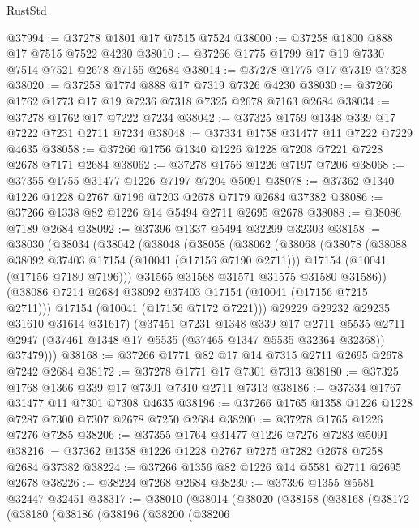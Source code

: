 \begin{lexlean}{RustStd}
\begin{coremodule}
@37994 := @37278 @1801 @17 @7515 @7524
@38000 := @37258 @1800 @888 @17 @7515 @7522 @4230
@38010 := @37266 @1775 @1799 @17 @19 @7330 @7514 @7521 @2678 @7155 @2684
@38014 := @37278 @1775 @17 @7319 @7328
@38020 := @37258 @1774 @888 @17 @7319 @7326 @4230
@38030 := @37266 @1762 @1773 @17 @19 @7236 @7318 @7325 @2678 @7163 @2684
@38034 := @37278 @1762 @17 @7222 @7234
@38042 := @37325 @1759 @1348 @339 @17 @7222 @7231 @2711 @7234
@38048 := @37334 @1758 @31477 @11 @7222 @7229 @4635
@38058 := @37266 @1756 @1340 @1226 @1228 @7208 @7221 @7228 @2678 @7171 @2684
@38062 := @37278 @1756 @1226 @7197 @7206
@38068 := @37355 @1755 @31477 @1226 @7197 @7204 @5091
@38078 := @37362 @1340 @1226 @1228 @2767 @7196 @7203 @2678 @7179 @2684 @37382
@38086 := @37266 @1338 @82 @1226 @14 @5494 @2711 @2695 @2678
@38088 := @38086 @7189 @2684
@38092 := @37396 @1337 @5494 @32299 @32303
@38158 := @38030
    (@38034
      (@38042
        (@38048
          (@38058
            (@38062
              (@38068
                (@38078
                  (@38088 @38092 @37403 @17154 (@10041 (@17156 @7190 @2711)))
                  @17154
                  (@10041 (@17156 @7180 @7196)))
                @31565
                @31568
                @31571
                @31575
                @31580
                @31586))
            (@38086 @7214 @2684 @38092 @37403 @17154 (@10041 (@17156 @7215 @2711)))
            @17154
            (@10041 (@17156 @7172 @7221)))
          @29229
          @29232
          @29235
          @31610
          @31614
          @31617)
        (@37451
          @7231
          @1348
          @339
          @17
          @2711
          @5535
          @2711
          @2947
          (@37461 @1348 @17 @5535 (@37465 @1347 @5535 @32364 @32368))
          @37479)))
@38168 := @37266 @1771 @82 @17 @14 @7315 @2711 @2695 @2678 @7242 @2684
@38172 := @37278 @1771 @17 @7301 @7313
@38180 := @37325 @1768 @1366 @339 @17 @7301 @7310 @2711 @7313
@38186 := @37334 @1767 @31477 @11 @7301 @7308 @4635
@38196 := @37266 @1765 @1358 @1226 @1228 @7287 @7300 @7307 @2678 @7250 @2684
@38200 := @37278 @1765 @1226 @7276 @7285
@38206 := @37355 @1764 @31477 @1226 @7276 @7283 @5091
@38216 := @37362 @1358 @1226 @1228 @2767 @7275 @7282 @2678 @7258 @2684 @37382
@38224 := @37266 @1356 @82 @1226 @14 @5581 @2711 @2695 @2678
@38226 := @38224 @7268 @2684
@38230 := @37396 @1355 @5581 @32447 @32451
@38317 := @38010
    (@38014
      (@38020
        (@38158
          (@38168
            (@38172
              (@38180
                (@38186
                  (@38196
                    (@38200
                      (@38206

\end{coremodule}
\end{lexlean}

